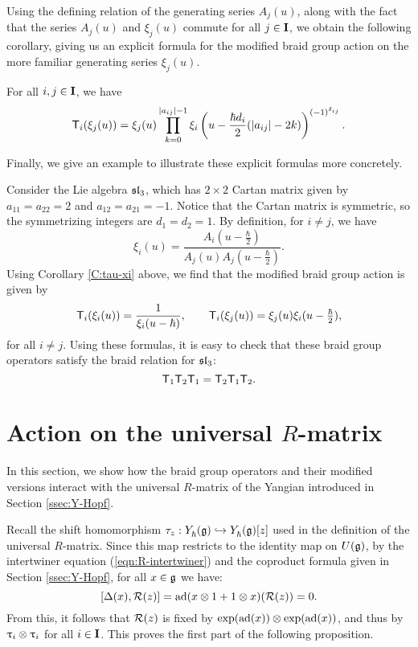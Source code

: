 Using the defining relation of the generating series $A_j(u)$, along with the fact that the series $A_j(u)$ and $\xi_j(u)$ commute for all $j\in\I$, we obtain the following corollary, giving us an explicit formula for the modified braid group action on the more familiar generating series $\xi_j(u)$.

\begin{corollary}\label{C:tau-xi}
    For all $i,j\in\I$, we have
    \[\mbraid_i(\xi_j(u)) = \xi_j(u)\prod_{k=0}^{\abs{a_{ij}}-1} \xi_i\left(u-\frac{\hbar d_i}{2}(\abs{a_{ij}}-2k)\right)^{(-1)^{\delta_{ij}}}.\]
\end{corollary}

Finally, we give an example to illustrate these explicit formulas more concretely.

\begin{example}\label{E:sl3-mbraid-action}
    Consider the Lie algebra $\mfsl_3$, which has $2\times 2$ Cartan matrix given by $a_{11}=a_{22}=2$ and $a_{12}=a_{21}=-1$.
    Notice that the Cartan matrix is symmetric, so the symmetrizing integers are $d_1=d_2=1$.
    By definition, for $i\neq j$, we have
    \[\xi_i(u) = \frac{A_i(u-\frac{\hbar}{2})}{A_j(u)A_j(u-\frac{\hbar}{2})}.\]
    Using Corollary \ref{C:tau-xi} above, we find that the modified braid group action is given by
    \[\mbraid_i(\xi_i(u)) = \frac{1}{\xi_i(u-\hbar)}, \qquad
    \mbraid_i(\xi_j(u)) = \xi_j(u)\xi_i(u-\tfrac{\hbar}{2}),\]
    for all $i\neq j$.
    Using these formulas, it is easy to check that these braid group operators satisfy the braid relation for $\mfsl_3$:
    \[\mbraid_1\mbraid_2\mbraid_1 = \mbraid_2\mbraid_1\mbraid_2.\]
\end{example}


\section{Action on the universal \texorpdfstring{$R$}{R}-matrix}

In this section, we show how the braid group operators and their modified versions interact with the universal $R$-matrix of the Yangian introduced in Section \ref{ssec:Y-Hopf}.

Recall the shift homomorphism $\tau_z:\Yhg\inj\Yhg[][z]$ used in the definition of the universal $R$-matrix.
Since this map restricts to the identity map on $\Ug$, by the intertwiner equation (\ref{eqn:R-intertwiner}) and the coproduct formula given in Section \ref{ssec:Y-Hopf}, for all $x\in\g$ we have:
\[[\Delta(x), \rmat(z)] = \ad(x\otimes 1 + 1\otimes x)(\rmat(z)) = 0.\]
From this, it follows that $\rmat(z)$ is fixed by $\exp(\ad(x))\otimes\exp(\ad(x))$, and thus by $\braid_i\otimes\braid_i$ for all $i\in\I$.
This proves the first part of the following proposition.

